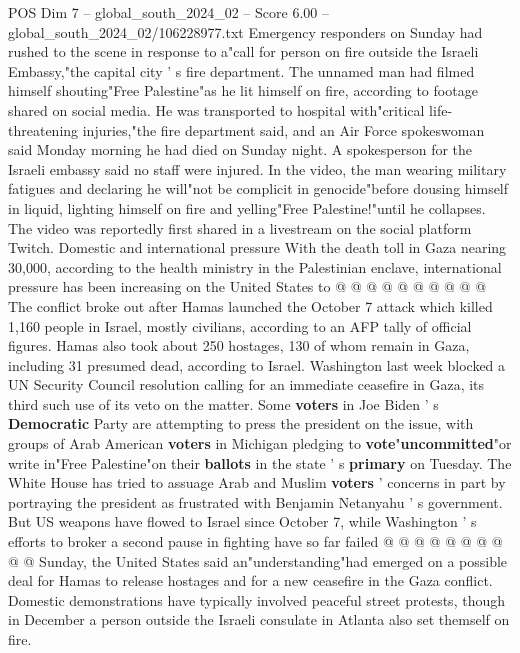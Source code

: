 \begin{textsample}{POS Dim 7 – global\_south\_2024\_02 – Score 6.00 – global\_south\_2024\_02/106228977.txt}  \label{ex:f7_pos_200}
Emergency responders on Sunday had rushed to the scene in response to a"call for person on fire outside the Israeli Embassy,"the capital city ' s fire department.
The unnamed man had filmed himself shouting"Free Palestine"as he lit himself on fire, according to footage shared on social media.
He was transported to hospital with"critical life-threatening injuries,"the fire department said, and an Air Force spokeswoman said Monday morning he had died on Sunday night.
A spokesperson for the Israeli embassy said no staff were injured.
In the video, the man wearing military fatigues and declaring he will"not be complicit in genocide"before dousing himself in liquid, lighting himself on fire and yelling"Free Palestine!"until he collapses.
The video was reportedly first shared in a livestream on the social platform Twitch.
Domestic and international pressure With the death toll in Gaza nearing 30,000, according to the health ministry in the Palestinian enclave, international pressure has been increasing on the United States to @ @ @ @ @ @ @ @ @ @ The conflict broke out after Hamas launched the October 7 attack which killed 1,160 people in Israel, mostly civilians, according to an AFP tally of official figures.
Hamas also took about 250 hostages, 130 of whom remain in Gaza, including 31 presumed dead, according to Israel.
Washington last week blocked a UN Security Council resolution calling for an immediate ceasefire in Gaza, its third such use of its veto on the matter.
Some \textbf{voters} in Joe Biden ' s \textbf{Democratic} Party are attempting to press the president on the issue, with groups of Arab American \textbf{voters} in Michigan pledging to \textbf{vote}"\textbf{uncommitted}"or write in"Free Palestine"on their \textbf{ballots} in the state ' s \textbf{primary} on Tuesday.
The White House has tried to assuage Arab and Muslim \textbf{voters} ' concerns in part by portraying the president as frustrated with Benjamin Netanyahu ' s government.
But US weapons have flowed to Israel since October 7, while Washington ' s efforts to broker a second pause in fighting have so far failed @ @ @ @ @ @ @ @ @ @ Sunday, the United States said an"understanding"had emerged on a possible deal for Hamas to release hostages and for a new ceasefire in the Gaza conflict.
Domestic demonstrations have typically involved peaceful street protests, though in December a person outside the Israeli consulate in Atlanta also set themself on fire.

\end{textsample}
